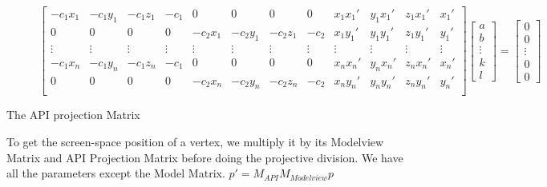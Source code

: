 \documentclass[conference]{IEEEtran}
\begin{document}
\begin{figure}[htbp]
    \begin{equation} \label{eqn:DLT}
        \begin{bmatrix}
            -c_1 x_1 & -c_1 y_1 & -c_1 z_1 & -c_1   & 0        & 0        & 0        & 0      & x_1 x_{1}' & y_1 x_{1}' & z_1 x_{1}' & x_{1}' \\
            0        & 0        & 0        & 0      & -c_2 x_1 & -c_2 y_1 & -c_2 z_1 & -c_2   & x_1 y_{1}' & y_1 y_{1}' & z_1 y_{1}' & y_{1}' \\
            \vdots   & \vdots   & \vdots   & \vdots & \vdots   & \vdots   & \vdots   & \vdots & \vdots     & \vdots     & \vdots     & \vdots \\
            -c_1 x_n & -c_1 y_n & -c_1 z_n & -c_1   & 0        & 0        & 0        & 0      & x_n x_{n}' & y_n x_{n}' & z_n x_{n}' & x_{n}' \\
            0        & 0        & 0        & 0      & -c_2 x_n & -c_2 y_n & -c_2 z_n & -c_2   & x_n y_{n}' & y_n y_{n}' & z_n y_{n}' & y_{n}' \\
        \end{bmatrix}
        \begin{bmatrix}
            a      \\
            b      \\
            \vdots \\
            k      \\
            l
        \end{bmatrix}
        =
        \begin{bmatrix}
            0      \\
            0      \\
            \vdots \\
            0      \\
            0
        \end{bmatrix}
    \end{equation}
\end{figure}


The API projection Matrix






To get the screen-space position of a vertex, we multiply it by its Modelview Matrix and API Projection Matrix before doing the projective division.
We have all the parameters except the Model Matrix. $p' = M_{API} M_{Modelview} p$
\end{document}
